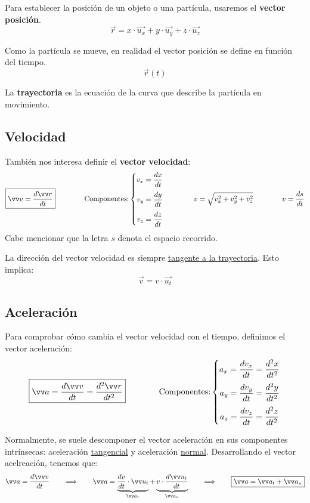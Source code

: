 \documentclass[a4paper]{book}
\begin{document}
Para establecer la posición de un objeto o una partícula, usaremos el \textbf{vector posición}. \[\boxed{\vec{r} = x\cdot \vec{u_x} + y\cdot \vec{u_y} + z\cdot \vec{u_z}}\]

Como la partícula se mueve, en realidad el vector posición se define en función del tiempo. \[\vec{r} (t)\]

La \textbf{trayectoria} es la ecuación de la curva que describe la partícula en movimiento.

\subsection{Velocidad}
También nos interesa definir el \textbf{vector velocidad}:
\[\boxed{\vec{v} = \dv{\vec{r}}{t}} \qquad \qquad \text{Componentes:} \left\{ \begin{matrix}
		\displaystyle{v_x = \dv{x}{t}} \\[10pt]
		\displaystyle{v_y = \dv{y}{t}} \\[10pt]
		\displaystyle{v_z = \dv{z}{t}}\end{matrix} \right. \qquad \qquad v = \sqrt{v_x^2+v_y^2+v_z^2}\qquad \qquad v=\dv{s}{t} \]
Cabe mencionar que la letra $s$ denota el espacio recorrido.

La dirección del vector velocidad es siempre \underline{tangente a la trayectoria}. Esto implica: \[\vec{v}=v\cdot \vec{u_t}\]

\subsection{Aceleración}
Para comprobar cómo cambia el vector velocidad con el tiempo, definimos el vector aceleración: \[\boxed{\vec{a} = \dv{\vec{v}}{t}=\dv{^2 \vec{r}}{t^2}} \qquad \qquad \text{Componentes:}\left\{ \begin{matrix}
		\displaystyle{a_x = \dv{v_x}{t} = \dv{^2x}{t^2}} \\[10pt]
		\displaystyle{a_y = \dv{v_y}{t} = \dv{^2y}{t^2}} \\[10pt]
		\displaystyle{a_z = \dv{v_z}{t} = \dv{^2z}{t^2}}\end{matrix} \right. \]

Normalmente, se suele descomponer el vector aceleración en sus componentes intrínsecas: aceleración \underline{tangencial} y aceleración \underline{normal}. Desarrollando el vector acelreación, tenemos que: \[ \vec{a} = \dv{\vec{v}}{t} \qquad \Longrightarrow \qquad
	\vec{a} = \underbrace{\dv{v}{t}\cdot \vec{u_t}}_{\vec{a_t}} + \underbrace{v\cdot \dv{\vec{u_t}}{t}}_{\vec{a_n}}\qquad \Longrightarrow \qquad \boxed{\vec{a} = \vec{a_t} + \vec{a_n}}\]
\end{document}
